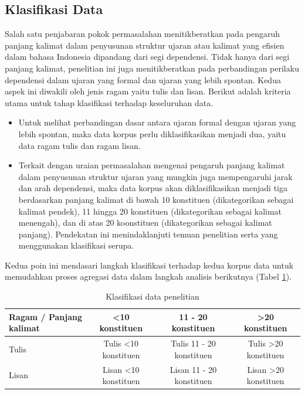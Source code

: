 \subsection{Klasifikasi Data}
Salah satu penjabaran pokok permasalahan menitikberatkan pada pengaruh panjang kalimat dalam penyusunan struktur ujaran atau kalimat yang efisien dalam bahasa Indonesia dipandang dari segi dependensi. Tidak hanya dari segi panjang kalimat, penelitian ini juga menitikberatkan pada perbandingan perilaku dependensi dalam ujaran yang formal dan ujaran yang lebih spontan. Kedua aspek ini diwakili oleh jenis ragam yaitu tulis dan lisan. Berikut adalah kriteria utama untuk tahap klasifikasi terhadap keseluruhan data.

\begin{itemize}
	\item Untuk melihat perbandingan dasar antara ujaran formal dengan ujaran yang lebih spontan, maka data korpus perlu diklasifikasikan menjadi dua, yaitu data ragam tulis dan ragam lisan.
	\item Terkait dengan uraian permasalahan mengenai pengaruh panjang kalimat dalam penyusunan struktur ujaran yang mungkin juga mempengaruhi jarak dan arah dependensi, maka data korpus akan diklasifikasikan menjadi tiga berdasarkan panjang kalimat di bawah 10 konstituen (dikategorikan sebagai kalimat pendek), 11 hingga 20 konstituen (dikategorikan sebagai kalimat menengah), dan di atas 20 koonstituen (dikategorikan sebagai kalimat panjang). Pendekatan ini menindaklanjuti temuan penelitian \cite{oya2011syntactic} serta \cite{jiang2015effects} yang menggunakan klasifikasi serupa. 
\end{itemize}

Kedua poin ini mendasari langkah klasifikasi terhadap kedua korpus data untuk memudahkan proses agregasi data dalam langkah analisis berikutnya (Tabel \ref{tab:tabel_klasifikasi_data}). 

\begin{table}
\begin{footnotesize}
\begin{center}
  \caption{Klasifikasi data penelitian}\label{tab:tabel_klasifikasi_data}
  \begin{tabular}{ | p{3cm} | c | c | c |}
    \hline
    Ragam / Panjang kalimat & \textless 10 konstituen & 11 - 20 konstituen & \textgreater 20 konstituen \\ \hline
    Tulis & Tulis \textless 10 konstituen & Tulis 11 - 20 konstituen & Tulis \textgreater 20 konstituen  \\ \hline
    Lisan & Lisan \textless 10 konstituen & Lisan 11 - 20 konstituen & Lisan \textgreater 20 konstituen \\
    \hline
  \end{tabular}
\end{center}
\end{footnotesize}
\end{table}

